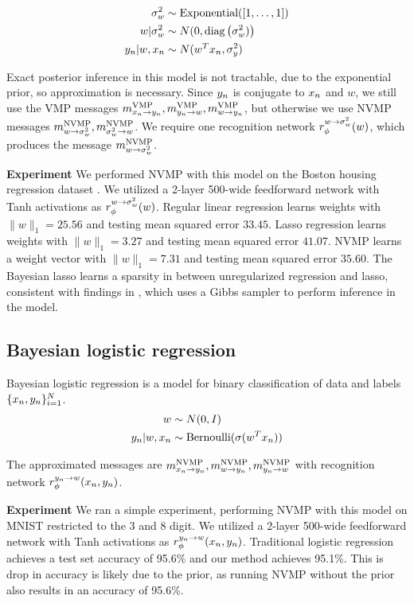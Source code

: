 \begin{align*}
    \sigma_w^2 &\sim \text{Exponential}([1, \ldots, 1]) \\
    w | \sigma^2_w &\sim N(0, \text{diag}\left(\sigma_w^2)\right) \\
    y_n | w, x_n &\sim N(w^Tx_n, \sigma^2_y)
\end{align*}

Exact posterior inference in this model is not tractable, due
to the exponential prior, so approximation is necessary. 
Since $y_n$ is conjugate to $x_n$ and $w$, we still use
the VMP messages $m^{\text{VMP}}_{x_n \rightarrow y_n}, m^{\text{VMP}}_{y_n \rightarrow w}, m^{\text{VMP}}_{w \rightarrow y_n}$,
but otherwise we use NVMP messages $m^{\text{NVMP}}_{w \rightarrow \sigma_w^2}, m^{\text{NVMP}}_{\sigma_w^2 \rightarrow w}$. We require one recognition
network $r_{\phi}^{w \rightarrow \sigma^2_w}(w)$, which produces the message $m^{\text{NVMP}}_{w \rightarrow \sigma_w^2}$.

\textbf{Experiment} We performed NVMP with this model on the
Boston housing regression dataset \citep{Lichman2013}.
We utilized a 2-layer 500-wide feedforward network with Tanh activations
as $r_{\phi}^{w \rightarrow \sigma^2_w}(w)$.
Regular linear regression learns weights with $\|w\|_1 = 25.56$
and testing mean squared error $33.45$.
Lasso regression learns weights with $\|w\|_1 = 3.27$ 
and testing mean squared error $41.07$.
NVMP learns a weight vector with $\|w\|_1 = 7.31$
and testing mean squared error $35.60$.
The Bayesian lasso learns a sparsity
in between unregularized regression and lasso,
consistent with findings in \citet{Park2008},
which uses a Gibbs sampler to perform inference in the model.

\subsection{Bayesian logistic regression}

Bayesian logistic regression is a model for binary classification
of data and labels $\{x_n, y_n\}_{i = 1}^N$.
\begin{align*}
    w &\sim N(0, I) \\
    y_n | w, x_n &\sim \text{Bernoulli}(\sigma(w^Tx_n))
\end{align*}

The approximated messages are $m^{\text{NVMP}}_{x_n \rightarrow y_n}, m^{\text{NVMP}}_{w \rightarrow y_n}, m^{\text{NVMP}}_{y_n \rightarrow w}$ with recognition network $r_{\phi}^{y_n \rightarrow w}(x_n, y_n)$.

\textbf{Experiment} We ran a simple experiment, performing
NVMP with this model on MNIST restricted to the 3 and 8 digit.
We utilized a 2-layer 500-wide feedforward network with Tanh activations
as $r_{\phi}^{y_n \rightarrow w}(x_n, y_n)$.
Traditional logistic regression achieves a test set accuracy of 95.6\%
and our method achieves 95.1\%. This is drop in accuracy is likely due to the
prior, as running NVMP without the prior
also results in an accuracy of 95.6\%.

